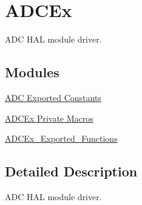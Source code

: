 \hypertarget{group___a_d_c_ex}{}\section{A\+D\+C\+Ex}
\label{group___a_d_c_ex}


A\+DC H\+AL module driver.  


\subsection*{Modules}
\begin{DoxyCompactItemize}
\item 
\hyperlink{group___a_d_c___exported___constants}{A\+D\+C Exported Constants}
\item 
\hyperlink{group___a_d_c_ex___private___macros}{A\+D\+C\+Ex Private Macros}
\item 
\hyperlink{group___a_d_c_ex___exported___functions}{A\+D\+C\+Ex\+\_\+\+Exported\+\_\+\+Functions}
\end{DoxyCompactItemize}


\subsection{Detailed Description}
A\+DC H\+AL module driver. 

